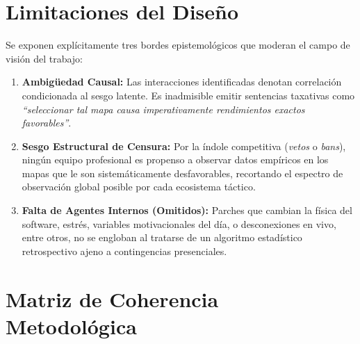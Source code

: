 \documentclass[12pt, a4paper]{article}
\begin{document}
\section{Limitaciones del Diseño}
Se exponen explícitamente tres bordes epistemológicos que moderan el campo de visión del trabajo:
\begin{enumerate}
    \item \textbf{Ambigüedad Causal:} Las interacciones identificadas denotan correlación condicionada al sesgo latente. Es inadmisible emitir sentencias taxativas como \textit{``seleccionar tal mapa causa imperativamente rendimientos exactos favorables''}.
    \item \textbf{Sesgo Estructural de Censura:} Por la índole competitiva (\textit{vetos} o \textit{bans}), ningún equipo profesional es propenso a observar datos empíricos en los mapas que le son sistemáticamente desfavorables, recortando el espectro de observación global posible por cada ecosistema táctico.
    \item \textbf{Falta de Agentes Internos (Omitidos):} Parches que cambian la física del software, estrés, variables motivacionales del día, o desconexiones en vivo, entre otros, no se engloban al tratarse de un algoritmo estadístico retrospectivo ajeno a contingencias presenciales.
\end{enumerate}

\section{Matriz de Coherencia Metodológica}
\end{document}
